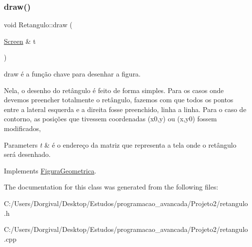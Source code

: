 \subsubsection{\texorpdfstring{draw()}{draw()}}
{\footnotesize\ttfamily void Retangulo\+::draw (\begin{DoxyParamCaption}\item[{\mbox{\hyperlink{class_screen}{Screen}} \&}]{t }\end{DoxyParamCaption})\hspace{0.3cm}{\ttfamily [virtual]}}



draw é a função chave para desenhar a figura. 

Nela, o desenho do retângulo é feito de forma simples. Para os casos onde devemos preencher totalmente o retângulo, fazemos com que todos os pontos entre a lateral esquerda e a direita fosse preenchido, linha a linha. Para o caso de contorno, as posições que tivessem coordenadas (x0,y) ou (x,y0) fossem modificados, 
\begin{DoxyParams}{Parameters}
{\em t} & é o endereço da matriz que representa a tela onde o retângulo será desenhado. \\
\hline
\end{DoxyParams}


Implements \mbox{\hyperlink{class_figura_geometrica}{Figura\+Geometrica}}.



The documentation for this class was generated from the following files\+:\begin{DoxyCompactItemize}
\item 
C\+:/\+Users/\+Dorgival/\+Desktop/\+Estudos/programacao\+\_\+avancada/\+Projeto2/retangulo.\+h\item 
C\+:/\+Users/\+Dorgival/\+Desktop/\+Estudos/programacao\+\_\+avancada/\+Projeto2/retangulo.\+cpp\end{DoxyCompactItemize}
